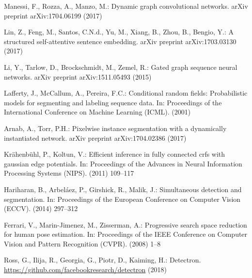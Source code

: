 \documentclass[10pt, letterpaper]{article}
\begin{document}
\begin{thebibliography}{10}
Manessi, F., Rozza, A., Manzo, M.:
\newblock Dynamic graph convolutional networks.
\newblock arXiv preprint arXiv:1704.06199 (2017)

Lin, Z., Feng, M., Santos, C.N.d., Yu, M., Xiang, B., Zhou, B., Bengio, Y.:
\newblock A structured self-attentive sentence embedding.
\newblock arXiv preprint arXiv:1703.03130 (2017)

Li, Y., Tarlow, D., Brockschmidt, M., Zemel, R.:
\newblock Gated graph sequence neural networks.
\newblock arXiv preprint arXiv:1511.05493 (2015)

Lafferty, J., McCallum, A., Pereira, F.C.:
\newblock Conditional random fields: Probabilistic models for segmenting and
  labeling sequence data.
\newblock In: Proceedings of the International Conference on Machine Learning
  (ICML). (2001)

Arnab, A., Torr, P.H.:
\newblock Pixelwise instance segmentation with a dynamically instantiated
  network.
\newblock arXiv preprint arXiv:1704.02386 (2017)

Kr{\"a}henb{\"u}hl, P., Koltun, V.:
\newblock Efficient inference in fully connected crfs with gaussian edge
  potentials.
\newblock In: Proceedings of the Advances in Neural Information Processing
  Systems (NIPS). (2011)  109--117

Hariharan, B., Arbel{\'a}ez, P., Girshick, R., Malik, J.:
\newblock Simultaneous detection and segmentation.
\newblock In: Proceedings of the European Conference on Computer Vision (ECCV).
  (2014)  297--312

Ferrari, V., Marin-Jimenez, M., Zisserman, A.:
\newblock Progressive search space reduction for human pose estimation.
\newblock In: Proceedings of the IEEE Conference on Computer Vision and Pattern
  Recognition (CVPR). (2008)  1--8

Ross, G., Ilija, R., Georgia, G., Piotr, D., Kaiming, H.:
\newblock Detectron.
\newblock \url{https://github.com/facebookresearch/detectron} (2018)

\end{thebibliography}
\end{document}
